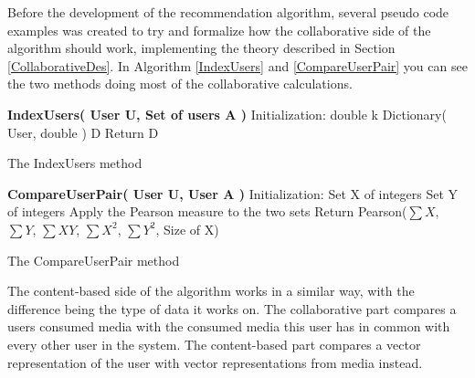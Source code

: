 Before the development of the recommendation algorithm, several pseudo code examples was created to try and formalize how the collaborative side of the algorithm should work, implementing the theory described in Section \ref{CollaborativeDes}. In Algorithm \ref{IndexUsers} and \ref{CompareUserPair} you can see the two methods doing most of the collaborative calculations.

\begin{algorithm}[H]
	\DontPrintSemicolon
	\;
	\textbf{IndexUsers( User U, Set of users A )}\;
	Initialization:\;
	double k\;
	Dictionary( User, double ) D\;
	Return D\;
	\label{IndexUsers}
	\caption{The IndexUsers method}
\end{algorithm}


\begin{algorithm}[H]
	\DontPrintSemicolon
	\;
	\textbf{CompareUserPair( User U, User A )}\;
	Initialization:\;
	Set X of integers\;
	Set Y of integers\;
	Apply the Pearson measure to the two sets
	Return Pearson($\sum{X}$, $\sum{Y}$, $\sum{XY}$, $\sum{X^2}$, $\sum{Y^2}$, Size of X)
	\label{CompareUserPair}
	\caption{The CompareUserPair method}
\end{algorithm}


The content-based side of the algorithm works in a similar way, with the difference being the type of data it works on. The collaborative part compares a users consumed media with the consumed media this user has in common with every other user in the system. The content-based part compares a vector representation of the user with vector representations from media instead.